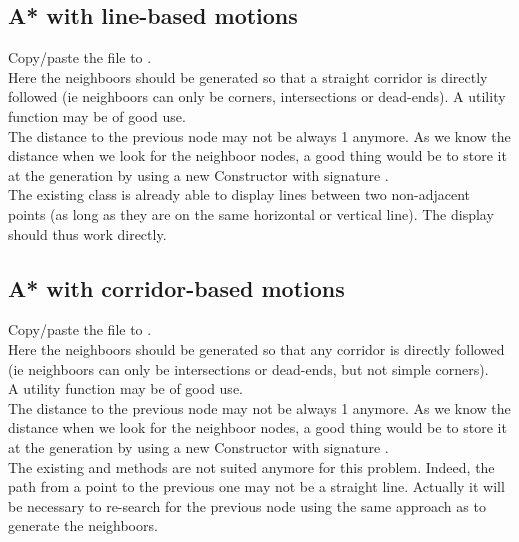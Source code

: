 \documentclass{ecnreport}
\begin{document}
\subsection{A* with line-based motions}

Copy/paste the  file to .\\

Here the neighboors should be generated so that a straight corridor is directly followed (ie neighboors can only be corners, intersections or dead-ends).
A utility function  may be of good use.\\

The distance to the previous node may not be always 1 anymore. As we know the distance when we look for the neighboor nodes, a good thing would be to store it
at the generation by using a new Constructor with signature .\\

The existing  class is already able to display lines between two non-adjacent points (as long as they are on the same horizontal or
vertical line). The display should thus work directly.

\subsection{A* with corridor-based motions}

Copy/paste the  file to .\\

Here the neighboors should be generated so that any corridor is directly followed (ie neighboors can only be intersections or dead-ends, but
not simple corners).\\
A utility function  may be of good use.\\

The distance to the previous node may not be always 1 anymore. As we know the distance when we look for the neighboor nodes, a good thing would be to store it
at the generation by using a new Constructor with signature . \\

The existing  and  methods are not suited anymore for this problem. Indeed, the path from a point to the previous one
may not be a straight line. Actually it will be necessary to re-search for the previous node using the same approach as to generate the neighboors.\\
\end{document}

